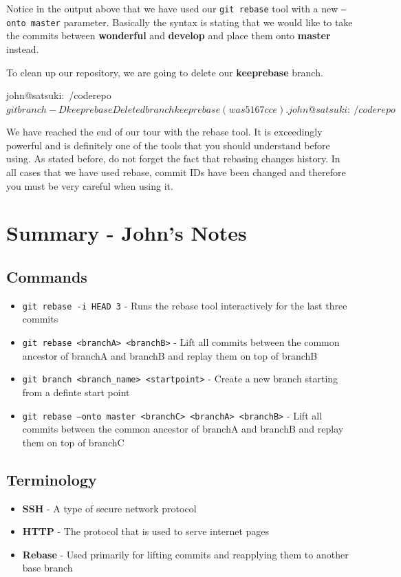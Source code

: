 Notice in the output above that we have used our \texttt{git rebase} tool with a new \texttt{--onto master} parameter.
Basically the syntax is stating that we would like to take the commits between \textbf{wonderful} and \textbf{develop} and place them onto \textbf{master} instead.

To clean up our repository, we are going to delete our \textbf{keeprebase} branch.

\begin{code}
john@satsuki:~/coderepo$ git branch -D keeprebase
Deleted branch keeprebase (was 5167cce).
john@satsuki:~/coderepo$
\end{code}

We have reached the end of our tour with the rebase tool.
It is exceedingly powerful and is definitely one of the tools that you should understand before using.
As stated before, do not forget the fact that rebasing changes history.
In all cases that we have used rebase, commit IDs have been changed and therefore you must be very careful when using it.

\clearpage

\section{Summary - John's Notes}
\subsection{Commands}
\begin{itemize}

\item\texttt{git rebase -i HEAD~3} - Runs the rebase tool interactively for the last three commits

\item\texttt{git rebase <branchA> <branchB>} - Lift all commits between the common ancestor of branchA and branchB and replay them on top of branchB

\item\texttt{git branch <branch\_name> <startpoint>} - Create a new branch starting from a definte start point

\item\texttt{git rebase --onto master <branchC> \newline <branchA> <branchB>} - Lift all commits between the common ancestor of branchA and branchB and replay them on top of branchC
\end{itemize}

\subsection{Terminology}
\begin{itemize}
\item\textbf{SSH} - A type of secure network protocol
\item\textbf{HTTP} - The protocol that is used to serve internet pages
\item\textbf{Rebase} - Used primarily for lifting commits and reapplying them to another base branch
\end{itemize}
